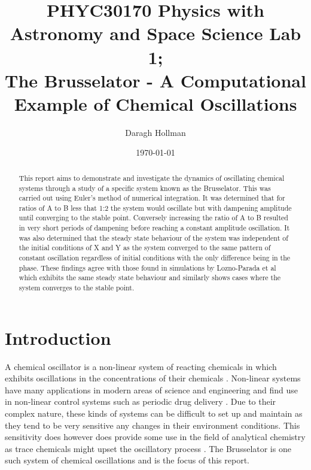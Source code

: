 \documentclass[reprint, amsmath, amssymb, aps]{revtex4-2}
\begin{document}
	
\title{PHYC30170 Physics with Astronomy and Space Science Lab 1;\\The Brusselator - A Computational Example of Chemical Oscillations}

\author{Daragh Hollman}
\date{\today}

\begin{abstract}
This report aims to demonstrate and investigate the dynamics of oscillating chemical systems through a study of a specific system known as the Brusselator. This was carried out using Euler's method of numerical integration. It was determined that for ratios of A to B less that 1:2 the system would oscillate but with dampening amplitude until converging to the stable point. Conversely increasing the ratio of A to B resulted in very short periods of dampening before reaching a constant amplitude oscillation. It was also determined that the steady state behaviour of the system was independent of the initial conditions of X and Y as the system converged to the same pattern of constant oscillation regardless of initial conditions with the only difference being in the phase. These findings agree with those found in simulations by Lozno-Parada et al\cite{parada} which exhibits the same steady state behaviour and similarly shows cases where the system converges to the stable point.
\end{abstract}

\maketitle

\section{Introduction}
A chemical oscillator is a non-linear system of reacting chemicals in which exhibits oscillations in the concentrations of their chemicals \cite{nicolis}. Non-linear systems have many applications in modern areas of science and engineering \cite{parada} and find use in non-linear control systems such as periodic drug delivery \citep{oscillationsAdvances}. Due to their complex nature, these kinds of systems can be difficult to set up and maintain as they tend to be very sensitive any changes in their environment conditions. This sensitivity does however does provide some use in the field of analytical chemistry as trace chemicals might upset the oscillatory process \cite{analytical}. The Brusselator is one such system of chemical oscillations and is the focus of this report.
\end{document}
